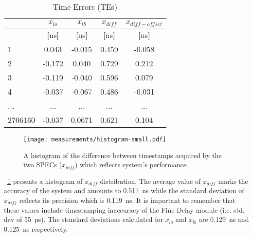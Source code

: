 \begin{table}[!t]
\caption{Time Errors (TEs)}
\centering
\begin{tabular}{| l | c| c | c | c |}          \hline
& \textbf{$x_{lo}$} & \textbf{$x_{lb}$} & \textbf{$x_{diff}$} & \textbf{$x_{diff-offset}$}\\   \hline
       & [ns]  &  [ns]  & [ns]  &  [ns]  \\   \hline
1      & 0.043 & -0.015 & 0.459 & -0.058 \\   \hline
2      &-0.172 &  0.040 & 0.729 &  0.212 \\   \hline
3      &-0.119 & -0.040 & 0.596 &  0.079 \\   \hline
4      &-0.037 & -0.067 & 0.486 & -0.031 \\   \hline
...    &  ...  &  ...   &  ...  &  ...   \\   \hline
2706160&-0.037 & 0.0671 & 0.621 & 0.104 \\   \hline
\end{tabular}
\label{tab:notRawData}
\end{table}

\begin{figure}[!t]
\centering
\texttt{[image: measurements/histogram-small.pdf]}
\caption{A histogram of the difference between timestamps 
acquired by the two SPECs ($x_{diff}$) which reflects system's performance.}
\label{fig:teAndHist}
\end{figure}



\figurename~\ref{fig:teAndHist} presents a histogram of $x_{diff}$ distribution. 
The average value of $x_{diff}$ marks the accuracy of the system and amounts to 0.517~ns
while the standard deviation of $x_{diff}$ reflects its precision which is 0.119~ns.
It is important to remember that these values include timestamping inaccuracy of the 
Fine Delay \cite{biblio:fineDelay} module (i.e. std. dev of 55~ps). 
The standard deviations calculated for $x_{lo}$ and $x_{lb}$ are 0.129~ns and 
0.125~ns respectively.

